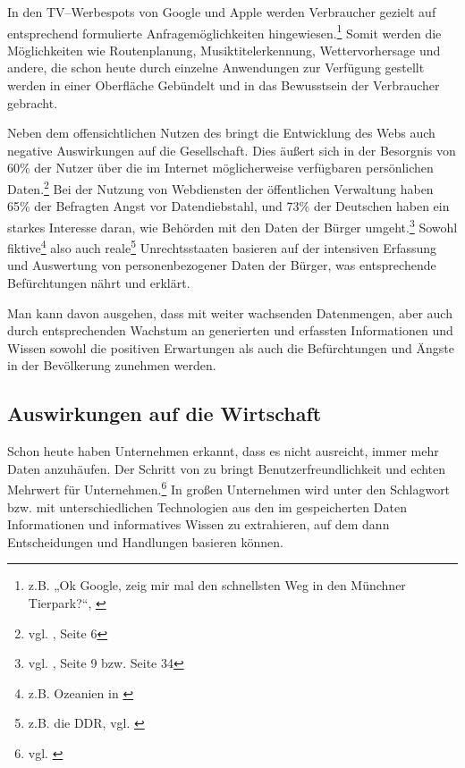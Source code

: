 In den TV--Werbespots von Google und Apple werden Verbraucher gezielt auf entsprechend formulierte Anfragemöglichkeiten hingewiesen.\footnote{z.B. „Ok Google, zeig mir mal den schnellsten Weg in den Münchner Tierpark?“, \cite{okg:tierpark}} Somit werden die Möglichkeiten wie Routenplanung, Musiktitelerkennung, Wettervorhersage und andere, die schon heute durch einzelne Anwendungen zur Verfügung gestellt werden in einer Oberfläche Gebündelt und in das Bewusstsein der Verbraucher gebracht.

\label{probleme}
Neben dem offensichtlichen Nutzen des  bringt die Entwicklung des Webs auch negative Auswirkungen auf die Gesellschaft. 
Dies äußert sich in der Besorgnis von 60\% der Nutzer über die im Internet möglicherweise verfügbaren persönlichen Daten.\footnote{vgl. \cite{d21}, Seite 6} Bei der Nutzung von Webdiensten der öffentlichen Verwaltung haben 65\% der Befragten Angst vor Datendiebstahl, und 73\% der Deutschen haben ein starkes Interesse daran, wie Behörden mit den Daten der Bürger umgeht.\footnote{vgl. \cite{d21gov}, Seite 9 bzw. Seite 34} Sowohl fiktive\footnote{z.B. Ozeanien in \cite{orwell}} also auch reale\footnote{z.B. die DDR, vgl. \cite{wp:stasi}} Unrechtsstaaten basieren auf der intensiven Erfassung und Auswertung von personenbezogener Daten der Bürger, was entsprechende Befürchtungen nährt und erklärt.

Man kann davon ausgehen, dass mit weiter wachsenden Datenmengen, aber auch durch entsprechenden Wachstum an generierten und erfassten Informationen und Wissen sowohl die positiven Erwartungen als auch die Befürchtungen und Ängste in der Bevölkerung zunehmen werden.

\subsection{Auswirkungen auf die Wirtschaft}

Schon heute haben Unternehmen erkannt, dass es nicht ausreicht, immer mehr Daten anzuhäufen. Der Schritt von  zu  bringt Benutzerfreundlichkeit und echten Mehrwert für Unternehmen.\footnote{vgl. \cite{odnsbi}} In großen Unternehmen wird unter den Schlagwort  bzw.  mit unterschiedlichen Technologien aus den im  gespeicherten Daten Informationen und informatives Wissen zu extrahieren, auf dem dann Entscheidungen und Handlungen basieren können. 

